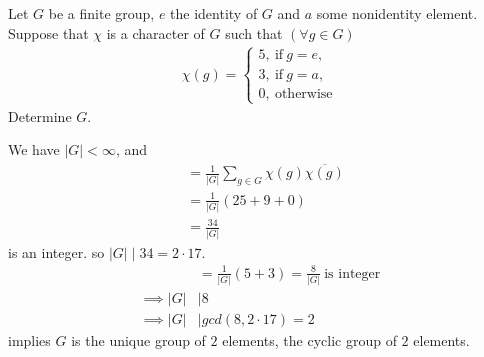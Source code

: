 \documentclass{article}
\begin{document}
\begin{homeworkProblem}
    Let $G$ be a finite group, $e$ the identity of $G$
    and $a$ some nonidentity element. Suppose that $\chi$
    is a character of $G$ such that $(\forall g \in G)$
    \begin{align}
        \chi (g) = 
        \begin{cases}
            5, \ \text{if} \ g=e,\\
            3, \ \text{if} \ g = a,\\
            0, \ \text{otherwise}
        \end{cases}
    \end{align}
    Determine $G$.\\
    \solution

    We have $\lvert G \rvert < \infty$, and
    \begin{align}
        [\chi, \chi] &= \frac{ 1 }{ \lvert G \rvert } \sum_{g \in G} 
        \chi(g) \overline{\chi(g)}\\
        &= \frac{ 1 }{ \lvert G \rvert }(25+9+0)\\
        &= \frac{ 34 }{ \lvert G \rvert }
    \end{align}
    is an integer. so $\lvert G \rvert \mid 34 = 2 \cdot 17$.\\
    \begin{align}
        [\chi, \mathbb{1}_G] &= \frac{ 1 }{ \lvert G \rvert }(5+3)
        = \frac{ 8 }{ \lvert G \rvert } \ \text{is integer}\\
        \implies \lvert G \rvert &\mid 8\\
        \implies \lvert G \rvert &\mid gcd(8, 2 \cdot 17) = 2
    \end{align}
    implies $G$ is the unique group of $2$ elements,
    the cyclic group of $2$ elements.

    
    


    
    
\end{homeworkProblem}
\end{document}
